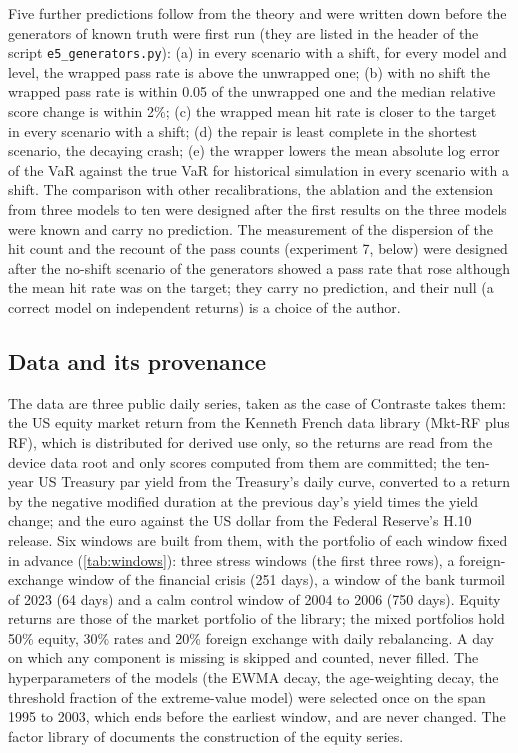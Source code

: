 Five further predictions follow from the theory and were written down before the generators of known truth were first run (they are listed in the header of the script \texttt{e5\_generators.py}): (a) in every scenario with a shift, for every model and level, the wrapped pass rate is above the unwrapped one; (b) with no shift the wrapped pass rate is within 0.05 of the unwrapped one and the median relative score change is within 2\%; (c) the wrapped mean hit rate is closer to the target in every scenario with a shift; (d) the repair is least complete in the shortest scenario, the decaying crash; (e) the wrapper lowers the mean absolute log error of the VaR against the true VaR for historical simulation in every scenario with a shift. The comparison with other recalibrations, the ablation and the extension from three models to ten were designed after the first results on the three models were known and carry no prediction. The measurement of the dispersion of the hit count and the recount of the pass counts (experiment 7, below) were designed after the no-shift scenario of the generators showed a pass rate that rose although the mean hit rate was on the target; they carry no prediction, and their null (a correct model on independent returns) is a choice of the author.

\subsection{Data and its provenance}
\label{sec:design-data}

The data are three public daily series, taken as the case of Contraste takes them: the US equity market return from the Kenneth French data library (Mkt-RF plus RF), which is distributed for derived use only, so the returns are read from the device data root and only scores computed from them are committed; the ten-year US Treasury par yield from the Treasury's daily curve, converted to a return by the negative modified duration at the previous day's yield times the yield change; and the euro against the US dollar from the Federal Reserve's H.10 release. Six windows are built from them, with the portfolio of each window fixed in advance (\cref{tab:windows}): three stress windows (the first three rows), a foreign-exchange window of the financial crisis (251 days), a window of the bank turmoil of 2023 (64 days) and a calm control window of 2004 to 2006 (750 days). Equity returns are those of the market portfolio of the library; the mixed portfolios hold 50\% equity, 30\% rates and 20\% foreign exchange with daily rebalancing. A day on which any component is missing is skipped and counted, never filled. The hyperparameters of the models (the EWMA decay, the age-weighting decay, the threshold fraction of the extreme-value model) were selected once on the span 1995 to 2003, which ends before the earliest window, and are never changed. The factor library of \citet{fama1993} documents the construction of the equity series.

